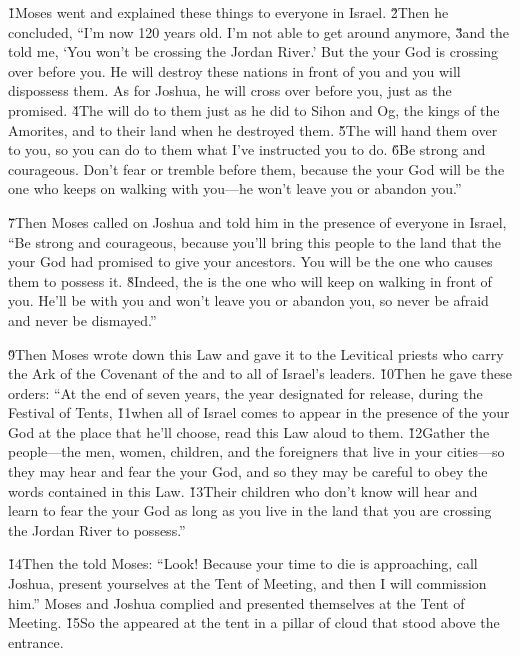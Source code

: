 \v{1}Moses went and explained these things to everyone in Israel. \v{2}Then he concluded, ``I'm now 120 years old. I'm not able to get around anymore, \v{3}and the  told me, `You won't be crossing the Jordan River.' But the  your God is crossing over before you. He will destroy these nations in front of you and you will dispossess them. As for Joshua, he will cross over before you, just as the  promised. \v{4}The  will do to them just as he did to Sihon and Og, the kings of the Amorites, and to their land when he destroyed them. \v{5}The  will hand them over to you, so you can do to them what I've instructed you to do. \v{6}Be strong and courageous. Don't fear or tremble before them, because the  your God will be the one who keeps on walking with you---he won't leave you or abandon you.''

\v{7}Then Moses called on Joshua and told him in the presence of everyone in Israel, ``Be strong and courageous, because you'll bring this people to the land that the  your God had promised to give your ancestors. You will be the one who causes them to possess it. \v{8}Indeed, the  is the one who will keep on walking in front of you. He'll be with you and won't leave you or abandon you, so never be afraid and never be dismayed.''

\v{9}Then Moses wrote down this Law and gave it to the Levitical priests who carry the Ark of the Covenant of the  and to all of Israel's leaders. \v{10}Then he gave these orders: ``At the end of seven years, the year designated for release, during the Festival of Tents, \v{11}when all of Israel comes to appear in the presence of the  your God at the place that he'll choose, read this Law aloud to them. \v{12}Gather the people---the men, women, children, and the foreigners that live in your cities---so they may hear and fear the  your God, and so they may be careful to obey the words contained in this Law. \v{13}Their children who don't know will hear and learn to fear the  your God as long as you live in the land that you are crossing the Jordan River to possess.''

\v{14}Then the  told Moses: ``Look! Because your time to die is approaching, call Joshua, present yourselves at the Tent of Meeting, and then I will commission him.'' Moses and Joshua complied and presented themselves at the Tent of Meeting. \v{15}So the  appeared at the tent in a pillar of cloud that stood above the entrance.

